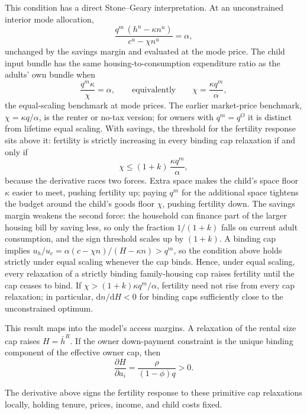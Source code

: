 \documentclass[11pt]{article}
\newcommand{\dd}{\mathrm d}
\newcommand{\1}{\mathbf 1}
\begin{document}
This condition has a direct Stone--Geary interpretation. At an unconstrained interior mode allocation,
\[
\frac{q^m\,(h^u-\kappa n^u)}{c^u-\chi n^u}=\alpha,
\]
unchanged by the savings margin and evaluated at the mode price. The child input bundle has the same housing-to-consumption expenditure ratio as the adults' own bundle when
\[
\frac{q^m\kappa}{\chi}=\alpha,
\qquad\text{equivalently}\qquad
\chi=\frac{\kappa q^m}{\alpha},
\]
the equal-scaling benchmark at mode prices. The earlier market-price benchmark, $\chi=\kappa q/\alpha$, is the renter or no-tax version; for owners with $q^m=q^O$ it is distinct from lifetime equal scaling. With savings, the threshold for the fertility response sits above it: fertility is strictly increasing in every binding cap relaxation if and only if
\[
\chi\le (1+k)\,\frac{\kappa q^m}{\alpha},
\]
because the derivative races two forces. Extra space makes the child's space floor $\kappa$ easier to meet, pushing fertility up; paying $q^m$ for the additional space tightens the budget around the child's goods floor $\chi$, pushing fertility down. The savings margin weakens the second force: the household can finance part of the larger housing bill by saving less, so only the fraction $1/(1+k)$ falls on current adult consumption, and the sign threshold scales up by $(1+k)$. A binding cap implies $u_h/u_c=\alpha(c-\chi n)/(H-\kappa n)>q^m$, so the condition above holds strictly under equal scaling whenever the cap binds. Hence, under equal scaling, every relaxation of a strictly binding family-housing cap raises fertility until the cap ceases to bind. If $\chi>(1+k)\kappa q^m/\alpha$, fertility need not rise from every cap relaxation; in particular, $\dd n/\dd H<0$ for binding caps sufficiently close to the unconstrained optimum.

This result maps into the model's access margins. A relaxation of the rental size cap raises $H=\bar h^R$. If the owner down-payment constraint is the unique binding component of the effective owner cap, then
\[
\frac{\partial H}{\partial a_i}
=
\frac{\rho}{(1-\phi)q}>0.
\]

The derivative above signs the fertility response to these primitive cap relaxations locally, holding tenure, prices, income, and child costs fixed.
\end{document}
